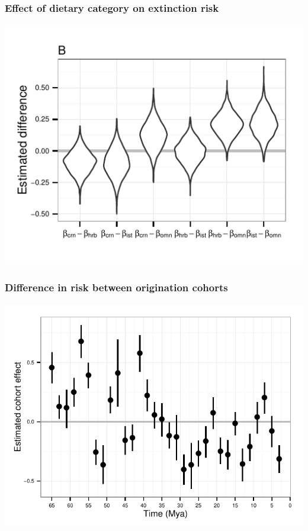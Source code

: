 \documentclass{beamer}
\begin{document}
\begin{frame}
  \frametitle{Effect of dietary category on extinction risk}

  \begin{center}
    \includegraphics[height=0.8\textheight,keepaspectratio=true]{figure/diet_diff_est}
  \end{center}

  \tiny{}
\end{frame}

\begin{frame}
  \frametitle{Difference in risk between origination cohorts}

  \begin{center}
    \includegraphics[height=0.8\textheight,keepaspectratio=true]{figure/cohort_est_pres}
  \end{center}

  \tiny{}
\end{frame}
\end{document}

